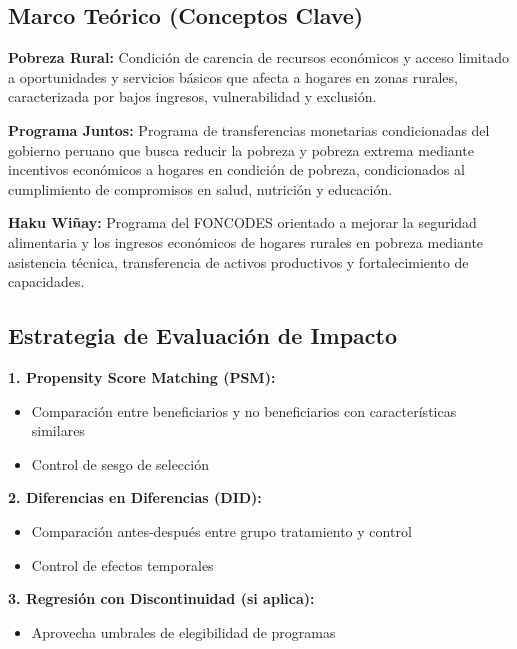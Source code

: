 \documentclass[
  man,
  floatsintext,
  longtable,
  a4paper,
  nolmodern,
  notxfonts,
  notimes,
  12pt,
  colorlinks=true,linkcolor=blue,citecolor=blue,urlcolor=blue]{apa7}
\providecommand{\tightlist}{%
  \setlength{\itemsep}{0pt}\setlength{\parskip}{0pt}}
\begin{document}
\subsection{Marco Teórico (Conceptos
Clave)}\label{marco-teuxf3rico-conceptos-clave-7}

\textbf{Pobreza Rural:} Condición de carencia de recursos económicos y
acceso limitado a oportunidades y servicios básicos que afecta a hogares
en zonas rurales, caracterizada por bajos ingresos, vulnerabilidad y
exclusión.

\textbf{Programa Juntos:} Programa de transferencias monetarias
condicionadas del gobierno peruano que busca reducir la pobreza y
pobreza extrema mediante incentivos económicos a hogares en condición de
pobreza, condicionados al cumplimiento de compromisos en salud,
nutrición y educación.

\textbf{Haku Wiñay:} Programa del FONCODES orientado a mejorar la
seguridad alimentaria y los ingresos económicos de hogares rurales en
pobreza mediante asistencia técnica, transferencia de activos
productivos y fortalecimiento de capacidades.

\subsection{Estrategia de Evaluación de
Impacto}\label{estrategia-de-evaluaciuxf3n-de-impacto}

\textbf{1. Propensity Score Matching (PSM):}

\begin{itemize}
\tightlist
\item
  Comparación entre beneficiarios y no beneficiarios con características
  similares
\item
  Control de sesgo de selección
\end{itemize}

\textbf{2. Diferencias en Diferencias (DID):}

\begin{itemize}
\tightlist
\item
  Comparación antes-después entre grupo tratamiento y control
\item
  Control de efectos temporales
\end{itemize}

\textbf{3. Regresión con Discontinuidad (si aplica):}

\begin{itemize}
\tightlist
\item
  Aprovecha umbrales de elegibilidad de programas
\end{itemize}
\end{document}
